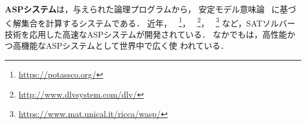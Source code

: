 
\textbf{ASPシステム}は，与えられた論理プログラムから，
安定モデル意味論~\cite{Gelfond88:iclp}
に基づく解集合を計算するシステムである．
近年，
{\clingo}~\footnote{\url{https://potassco.org/}}，
{\dlv}~\footnote{\url{http://www.dlvsystem.com/dlv/}}，
{\wasp}~\footnote{\url{https://www.mat.unical.it/ricca/wasp/}}
など，SATソルバー技術を応用した高速なASPシステムが開発されている．
なかでも{\clingo}は，高性能かつ高機能なASPシステムとして世界中で広く使
われている．










